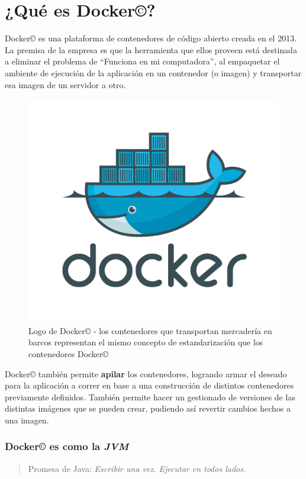 \documentclass[14pt]{extarticle}
\newcommand{\docker}{Docker\copyright}
\begin{document}
    \clearpage
    \pagebreak
    \section{¿Qué es \docker{}?}


        \docker{} es una plataforma de contenedores de código abierto creada en el 2013. La premisa de la empresa es que la herramienta que ellos proveen está destinada a eliminar el problema de ``Funciona en mi computadora''\cite{docker}, al empaquetar el ambiente de ejecución de la aplicación en un contenedor (o imagen) y transportar esa imagen de un servidor a otro.


        \begin{figure}[h]
            \centering
            \includegraphics[scale=0.30]{docker-logo.png}
            \caption{Logo de \docker{} - los contenedores que transportan mercadería en barcos representan el mismo concepto de estandarización que los contenedores \docker{}}
        \end{figure}

        \docker{} también permite \textbf{apilar} los contenedores, logrando armar el deseado para la aplicación a correr en base a una construcción de distintos contenedores previamente definidos. También permite hacer un gestionado de versiones de las distintas imágenes que se pueden crear, pudiendo así revertir cambios hechos a una imagen.
        
        \subsubsection*{\docker{} es como la \textit{JVM}}
            \begin{quote}
                Promesa de Java: \textit{Escribir una vez. Ejecutar en todos lados.}
            \end{quote}
\end{document}
